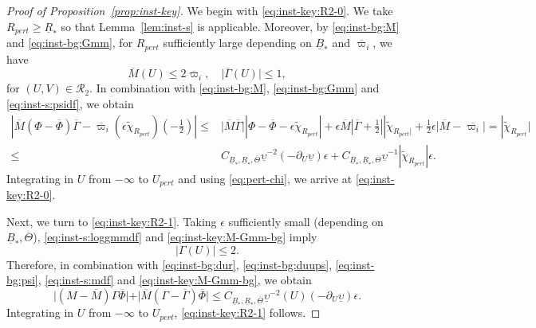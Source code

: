 \documentclass[10pt, reqno]{amsart}
\theoremstyle{definition}
\theoremstyle{remark}
\theoremstyle{conjecture}
\numberwithin{equation}{section}
\newcommand{\abs}[1]{\vert#1\vert}
\newcommand{\rd}{\partial}
\newcommand{\0}{\emptyset}
\newcommand{\Gmm}{\Gamma}
\newcommand{\eps}{\epsilon}
\newcommand{\Tht}{\Theta}
\newcommand{\ups}{\upsilon}
\newcommand{\calR}{\mathcal R}
\newcommand{\varpibg}{\overline{\varpi}}				%
\newcommand{\Phibg}{\overline{\Phi}}				%
\newcommand{\Abs}[1]{\left\vert #1 \right\vert}
\begin{document}
\begin{proof}[Proof of Proposition~\ref{prop:inst-key}]
We begin with \eqref{eq:inst-key:R2-0}. We take $R_{pert} \geq \underline{R}_{\ast}$ so that Lemma~\ref{lem:inst-s} is applicable. Moreover, by \eqref{eq:inst-bg:M} and \eqref{eq:inst-bg:Gmm}, for $R_{pert}$ sufficiently large depending on $\underline{B}_{\ast}$ and $\varpibg_{i}$, we have 
\begin{equation} \label{eq:inst-key:M-Gmm-bg}
	\overline{M}(U) \leq 2 \varpibg_{i}, \quad
	\abs{\overline{\Gmm}(U)} \leq 1,
\end{equation}
for $(U, V) \in \calR_{2}$. In combination with \eqref{eq:inst-bg:M}, \eqref{eq:inst-bg:Gmm} and \eqref{eq:inst-s:psidf}, we obtain
\begin{align*}
\Abs{\overline{M} (\Phi - \Phibg) \overline{\Gmm} - \varpibg_{i} (\eps \tilde{\chi}_{R_{pert}}) \left( -\frac{1}{2} \right)}
\leq & \abs{\overline{M} \overline{\Gmm}} \Abs{\Phi - \Phibg - \eps \tilde{\chi}_{R_{pert}}} + \eps \overline{M} \Abs{\overline{\Gmm} + \frac{1}{2}} |\tilde{\chi}_{R_{pert}|}
+ \frac{1}{2} \eps \abs{\overline{M} - \overline{\varpi_{i}}} =|\tilde{\chi}_{R_{pert}}| \\
\leq & C_{\underline{B}_{\ast},\underline{R}_*, \overline{\Tht}} \underline{\ups}^{-2} (-\rd_{U} \underline{\ups}) \eps
+ C_{\underline{B}_{\ast},\underline{R}_*, \overline{\Tht}} \underline{\ups}^{-1} |\tilde{\chi}_{R_{pert}}| \eps.
\end{align*}
Integrating in $U$ from $-\infty$ to $U_{pert}$ and using \eqref{eq:pert-chi}, we arrive at \eqref{eq:inst-key:R2-0}.

Next, we turn to \eqref{eq:inst-key:R2-1}. Taking $\eps$ sufficiently small (depending on $\underline{B}_{\ast}, \overline{\Tht}$), \eqref{eq:inst-s:loggmmdf} and \eqref{eq:inst-key:M-Gmm-bg} imply
\begin{equation} \label{eq:inst-key:Gmm}
	\abs{\Gmm(U)} \leq 2.
\end{equation}
Therefore, in combination with \eqref{eq:inst-bg:dur}, \eqref{eq:inst-bg:duups}, \eqref{eq:inst-bg:psi}, \eqref{eq:inst-s:mdf} and \eqref{eq:inst-key:M-Gmm-bg}, we obtain
\begin{equation*}
	\abs{(M - \overline{M}) \Gmm \overline{\Phi}} + \abs{\overline{M} (\Gmm - \overline{\Gmm}) \overline{\Phi}}
	\leq C_{\underline{B}_{\ast},\underline{R}_*, \overline{\Tht}} \underline{\ups}^{-2}(U) (- \rd_{U} \underline{\ups}) \eps.
\end{equation*}
Integrating in $U$ from $-\infty$ to $U_{pert}$, \eqref{eq:inst-key:R2-1} follows.


\end{proof}
\end{document}
